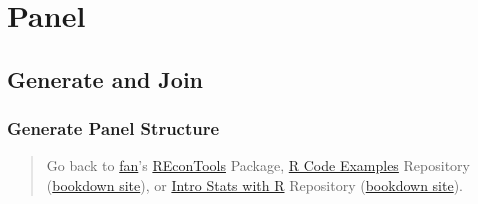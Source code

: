 \documentclass[
]{book}
\begin{document}
\begin{table}[!h]
\centering
{}
\end{table}

\hypertarget{panel}{%
\chapter{Panel}\label{panel}}

\hypertarget{generate-and-join}{%
\section{Generate and Join}\label{generate-and-join}}

\hypertarget{generate-panel-structure}{%
\subsection{Generate Panel Structure}\label{generate-panel-structure}}

\begin{quote}
Go back to \href{http://fanwangecon.github.io/}{fan}'s \href{https://fanwangecon.github.io/REconTools/}{REconTools} Package, \href{https://fanwangecon.github.io/R4Econ/}{R Code Examples} Repository (\href{https://fanwangecon.github.io/R4Econ/bookdown}{bookdown site}), or \href{https://fanwangecon.github.io/Stat4Econ/}{Intro Stats with R} Repository (\href{https://fanwangecon.github.io/Stat4Econ/bookdown}{bookdown site}).
\end{quote}
\end{document}
